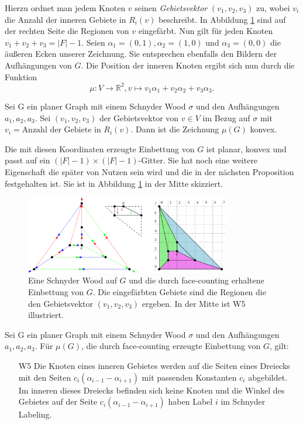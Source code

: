 Hierzu ordnet man jedem Knoten $v$ seinen \textit{Gebietsvektor} $(v_1,v_2,v_3)$ zu, wobei $v_i$ die Anzahl der inneren Gebiete in $R_i(v)$ beschreibt. In Abbildung \ref{face_counting} sind auf der rechten Seite die Regionen von $v$ eingefärbt. Nun gilt für jeden Knoten $v_1+v_2+v_3 = |F|-1$. Seien $\alpha_1 = (0,1),\alpha_2 = (1,0)$ und $\alpha_3 = (0,0)$ die äußeren Ecken unserer Zeichnung. Sie entsprechen ebenfalls den Bildern der Aufhängungen von $G$. Die Position der inneren Knoten ergibt sich nun durch die Funktion 
$$\mu: V \to \mathbb{R}^2,v\mapsto v_1\alpha_1 + v_2\alpha_2+v_3\alpha_3.$$ 

\begin{theorem}
Sei G ein planer Graph mit einem Schnyder Wood $\sigma$ und den Aufhängungen $a_1,a_2,a_3$. Sei $(v_1,v_2,v_3)$ der Gebietsvektor von $v \in V$ im Bezug auf $\sigma$ mit $ v_i = \text{Anzahl der Gebiete in }R_i(v).$ Dann ist die Zeichnung $\mu(G)$ konvex.
\end{theorem}

Die mit diesen Koordinaten erzeugte Einbettung von $G$ ist planar, konvex und passt auf ein $(|F|-1)\times(|F|-1)$-Gitter. Sie hat noch eine weitere Eigenschaft die später von Nutzen sein wird und die in der nächsten Proposition festgehalten ist.  Sie ist in Abbildung \ref{face_counting} in der Mitte skizziert.

\begin{figure}
	\centering
  \includegraphics[width=0.8\textwidth]{face_counting.png}
	\caption{Eine Schnyder Wood auf $G$ und die durch face-counting erhaltene Einbettung von $G$. Die eingefärbten Gebiete sind die Regionen die den Gebietsvektor $(v_1,v_2,v_3)$ ergeben. In der Mitte ist W5 illustriert.}
	\label{face_counting}
\end{figure}

\begin{proposition}\label{w5}
Sei G ein planer Graph mit einem Schnyder Wood $\sigma$ und den Aufhängungen $a_1,a_2,a_3$. Für $\mu(G)$, die durch face-counting erzeugte Einbettung von $G$, gilt:
\begin{itemize}
\item [W5] Die Knoten eines inneren Gebietes werden auf die Seiten eines Dreiecks mit den Seiten $c_i(\alpha_{i-1}-\alpha_{i+1})$ mit passenden Konstanten $c_i$ abgebildet. Im inneren dieses Dreiecks befinden sich keine Knoten und die Winkel des Gebietes auf der Seite $c_i(\alpha_{i-1}-\alpha_{i+1})$ haben Label $i$ im Schnyder Labeling.
\end{itemize}
\end{proposition}


